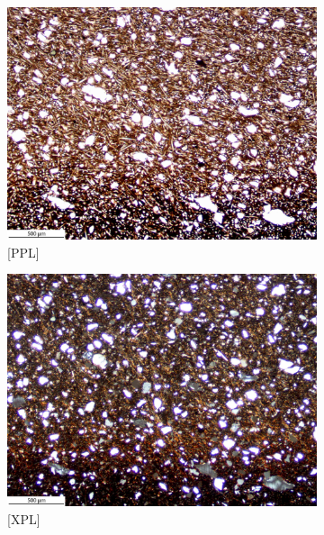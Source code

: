 \documentclass[a4paper]{article}
\begin{document}
\begin{figure}[H]
	\centering
	\begin{subfigure}[t]{.49\textwidth}
		\includegraphics[width=\textwidth]{ThinSections/107-1_4x_PPL.jpg}
		\caption{[PPL]}
	\end{subfigure}\hspace{.5em}\hfill
	\begin{subfigure}[t]{.49\textwidth}
		\includegraphics[width=\textwidth]{ThinSections/107-1_4x_XPL.jpg}
		\caption{[XPL]}
	\end{subfigure}
	\begin{subfigure}[t]{.49\textwidth}

\end{subfigure}
\end{figure}
\end{document}
